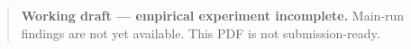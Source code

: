 \begin{quote}\textbf{Working draft --- empirical experiment incomplete.} Main-run findings are not yet available. This PDF is not submission-ready.\end{quote}
